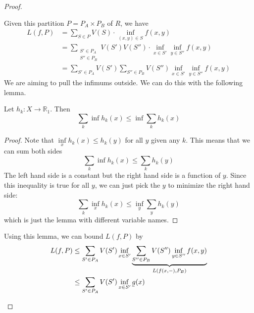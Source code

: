 \documentclass{article}
\newcommand{\ubar}[1]{\underaccent{\bar}{#1}}
\numberwithin{equation}{section}
\begin{document}
\begin{proof}
\begin{enumerate}
              Given this partition $P=P_A \times P_B$ of $R$, we have
              \begin{align}
                  L(f,P) & = \sum_{S\in P} V(S) \cdot \inf\limits_{(x,y)\in S} f(x,y)                                               \\
                         & = \sum_{\substack{S'\in P_A                                                                              \\ S'' \in P_B}} V(S')V(S'') \cdot \inf\limits_{x \in S'} \inf\limits_{y \in S''} f(x,y)\\
                         & = \sum_{S' \in P_A}V(S') \sum_{S'' \in P_B} V(S'') \inf\limits_{x \in S'} \inf\limits_{y \in S''} f(x,y)
              \end{align}
              We are aiming to pull the infimums outside. We can do this with the following lemma.
              \begin{lemma}
                  Let $h_k: X\rightarrow \mathbb{R}_1$. Then
                  \begin{equation}
                      \sum_k \inf h_k(x) \le \inf \sum_k h_k(x)
                  \end{equation}
              \end{lemma}
              \begin{proof}
                  Note that $\inf\limits_x h_k(x) \le h_k(y)$ for all $y$ given any $k$. This means that we can sum both sides
                  \begin{equation}
                      \sum_k \inf h_k(x) \le \sum_k h_k(y)
                  \end{equation}
                  The left hand side is a constant but the right hand side is a function of $y$. Since this inequality is true for all $y$, we can just pick the $y$ to minimize the right hand side:
                  \begin{equation}
                      \sum_k \inf\limits_x h_k(x) \le \inf\limits_y \sum_y h_k(y)
                  \end{equation}
                  which is just the lemma with different variable names.
              \end{proof}
              Using this lemma, we can bound $L(f,P)$ by
              \begin{align}
                  L(f,P) & \le \sum_{S' \in P_A}V(S')\inf_{x\in S'}\underbrace{\sum_{S''\in P_B}V(S'')\inf_{y\in S''}f(x,y)}_{L(f(x,-),P_B)} \\
                         & \le \sum_{S' \in P_A}V(S')\inf\limits_{x\in S'}\ubar{g}(x)                                                        \\

\end{align}
\end{enumerate}
\end{proof}
\end{document}
